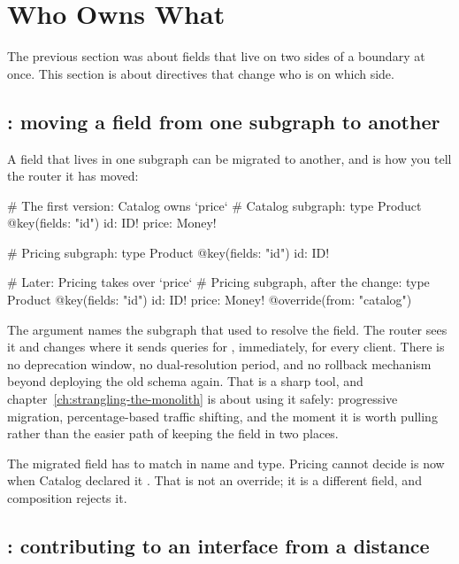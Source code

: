 \section{Who Owns What}
\label{sec:ch06-who-owns-what}
%

The previous section was about fields that live on two sides of a boundary at
once. This section is about directives that change who is on which side.

\subsection*{: moving a field from one subgraph to another}

%
A field that lives in one subgraph can be migrated to another, and
 is how you tell the router it has moved:

\begin{graphqlsdl}
# The first version: Catalog owns `price`
# Catalog subgraph:
type Product @key(fields: "id") {
  id: ID!
  price: Money!
}

# Pricing subgraph:
type Product @key(fields: "id") {
  id: ID!
}

# Later: Pricing takes over `price`
# Pricing subgraph, after the change:
type Product @key(fields: "id") {
  id: ID!
  price: Money! @override(from: "catalog")
}
\end{graphqlsdl}

%
The  argument names the subgraph that used to resolve the field. The
router sees it and changes where it sends queries for , immediately,
for every client. There is no deprecation window, no dual-resolution period, and
no rollback mechanism beyond deploying the old schema again. That is a sharp
tool, and chapter~\ref{ch:strangling-the-monolith} is about using it safely:
progressive migration, percentage-based traffic shifting, and the moment it is
worth pulling rather than the easier path of keeping the field in two places.

The migrated field has to match in name and type. Pricing cannot decide
 is now  when Catalog declared it . That is
not an override; it is a different field, and composition rejects it.

\subsection*{: contributing to an interface from a distance}

